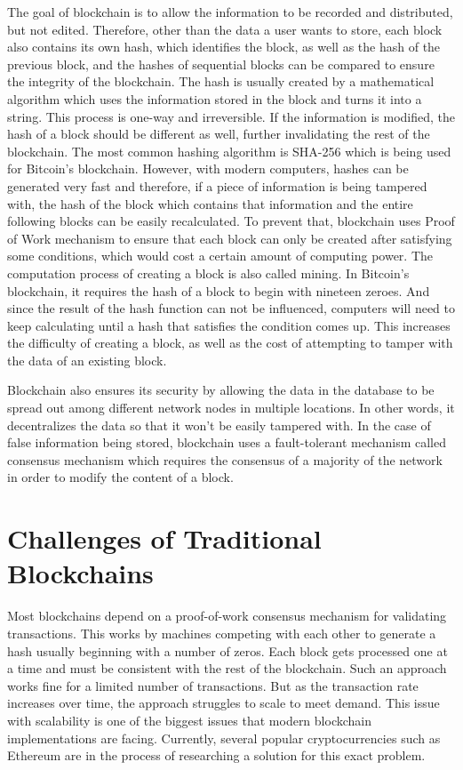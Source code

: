 The goal of blockchain is to allow the information to be recorded and distributed, but not edited. Therefore, other than the data a user wants to store, each block also contains its own hash, which identifies the block, as well as the hash of the previous block, and the hashes of sequential blocks can be compared to ensure the integrity of the blockchain. The hash is usually created by a mathematical algorithm which uses the information stored in the block and turns it into a string. This process is one-way and irreversible. If the information is modified, the hash of a block should be different as well, further invalidating the rest of the blockchain. The most common hashing algorithm is SHA-256 which is being used for Bitcoin’s blockchain. However, with modern computers, hashes can be generated very fast and therefore, if a piece of information is being tampered with, the hash of the block which contains that information and the entire following blocks can be easily recalculated. To prevent that, blockchain uses Proof of Work mechanism to ensure that each block can only be created after satisfying some conditions, which would cost a certain amount of computing power. The computation process of creating a block is also called mining. In Bitcoin’s blockchain, it requires the hash of a block to begin with nineteen zeroes. And since the result of the hash function can not be influenced, computers will need to keep calculating until a hash that satisfies the condition comes up. This increases the difficulty of creating a block, as well as the cost of attempting to tamper with the data of an existing block.

Blockchain also ensures its security by allowing the data in the database to be spread out among different network nodes in multiple locations. In other words, it decentralizes the data so that it won’t be easily tampered with. In the case of false information being stored, blockchain uses a fault-tolerant mechanism called consensus mechanism 
which requires the consensus of a majority of the network in order to modify the content of a block.

\section{Challenges of Traditional Blockchains}

Most blockchains depend on a proof-of-work consensus mechanism for validating transactions. This works by machines competing with each other to generate a hash usually beginning with a number of zeros. Each block gets processed one at a time and must be consistent with the rest of the blockchain. Such an approach works fine for a limited number of transactions. But as the transaction rate increases over time, the approach struggles to scale to meet demand. This issue with scalability is one of the biggest issues that modern blockchain implementations are facing. Currently, several popular cryptocurrencies such as Ethereum are in the process of researching a solution for this exact problem.

